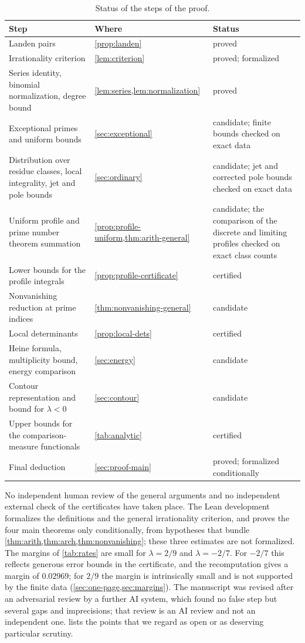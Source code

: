 \begin{table}[ht]
\centering
\caption{Status of the steps of the proof.}
\label{tab:status}
\small
\begin{tabular}{@{}>{\raggedright\arraybackslash}p{}>{\raggedright\arraybackslash}p{}>{\raggedright\arraybackslash}p{}@{}}
\toprule
Step & Where & Status\\
\midrule
Landen pairs & \cref{prop:landen} & proved\\
Irrationality criterion & \cref{lem:criterion} & proved; formalized\\
Series identity, binomial normalization, degree bound & \cref{lem:series,lem:normalization} & proved\\
Exceptional primes and uniform bounds & \cref{sec:exceptional} & candidate; finite bounds checked on exact data\\
Distribution over residue classes, local integrality, jet and pole bounds & \cref{sec:ordinary} & candidate; jet and corrected pole bounds checked on exact data\\
Uniform profile and prime number theorem summation & \cref{prop:profile-uniform,thm:arith-general} & candidate; the comparison of the discrete and limiting profiles checked on exact class counts\\
Lower bounds for the profile integrals & \cref{prop:profile-certificate} & certified\\
Nonvanishing reduction at prime indices & \cref{thm:nonvanishing-general} & candidate\\
Local determinants & \cref{prop:local-dets} & certified\\
Heine formula, multiplicity bound, energy comparison & \cref{sec:energy} & candidate\\
Contour representation and bound for $\lambda<0$ & \cref{sec:contour} & candidate\\
Upper bounds for the comparison-measure functionals & \cref{tab:analytic} & certified\\
Final deduction & \cref{sec:proof-main} & proved; formalized conditionally\\
\bottomrule
\end{tabular}
\end{table}

No independent human review of the general arguments and no independent external check of the certificates have taken place. The Lean development formalizes the definitions and the general irrationality criterion, and proves the four main theorems only conditionally, from hypotheses that bundle \cref{thm:arith,thm:arch,thm:nonvanishing}; these three estimates are not formalized. The margins of \cref{tab:rates} are small for $\lambda=2/9$ and $\lambda=-2/7$. For $-2/7$ this reflects generous error bounds in the certificate, and the recomputation gives a margin of $0.02969$; for $2/9$ the margin is intrinsically small and is not supported by the finite data (\cref{sec:one-page,sec:margins}). The manuscript was revised after an adversarial review by a further AI system, which found no false step but several gaps and imprecisions; that review is an AI review and not an independent one.  lists the points that we regard as open or as deserving particular scrutiny.


